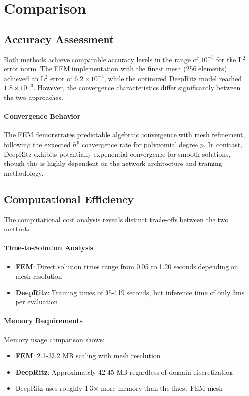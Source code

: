 \section{Comparison}
\subsection{Accuracy Assessment}

Both methods achieve comparable accuracy levels in the range of $10^{-3}$ for the L$^2$ error norm. The FEM implementation with the finest mesh (256 elements) achieved an L$^2$ error of $6.2 \times 10^{-4}$, while the optimized DeepRitz model reached $1.8 \times 10^{-3}$. However, the convergence characteristics differ significantly between the two approaches.

\paragraph{Convergence Behavior}
The FEM demonstrates predictable algebraic convergence with mesh refinement, following the expected $h^p$ convergence rate for polynomial degree $p$. In contrast, DeepRitz exhibits potentially exponential convergence for smooth solutions, though this is highly dependent on the network architecture and training methodology.

\subsection{Computational Efficiency}

The computational cost analysis reveals distinct trade-offs between the two methods:

\paragraph{Time-to-Solution Analysis}
\begin{itemize}
    \item \textbf{FEM}: Direct solution times range from 0.05 to 1.20 seconds depending on mesh resolution
    \item \textbf{DeepRitz}: Training times of 95-119 seconds, but inference time of only 3ms per evaluation
\end{itemize}

\paragraph{Memory Requirements}
Memory usage comparison shows:
\begin{itemize}
    \item \textbf{FEM}: 2.1-33.2 MB scaling with mesh resolution
    \item \textbf{DeepRitz}: Approximately 42-45 MB regardless of domain discretization
    \item DeepRitz uses roughly 1.3× more memory than the finest FEM mesh
\end{itemize}

